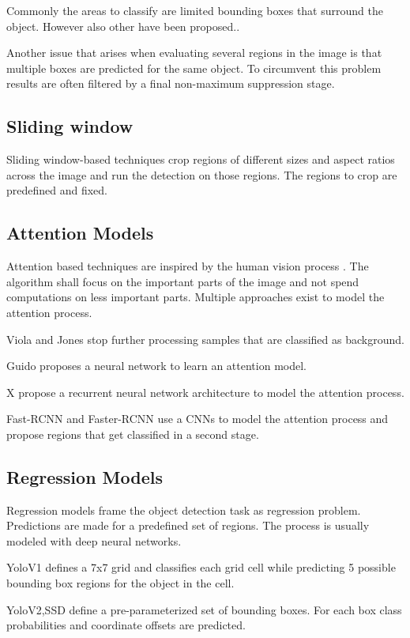 	Commonly the areas to classify are limited bounding boxes that surround the object. However also other have been proposed..	
	
	Another issue that arises when evaluating several regions in the image is that multiple boxes are predicted for the same object. To circumvent this problem results are often filtered by a final non-maximum suppression stage. 
	
	\subsection{Sliding window}
	
	Sliding window-based techniques crop regions of different sizes and aspect ratios across the image and run the detection on those regions. The regions to crop are predefined and fixed. 
	
	\subsection{Attention Models}
	
	Attention based techniques are inspired by the human vision process . The algorithm shall focus on the important parts of the image and not spend computations on less important parts. Multiple approaches exist to model the attention process.
	
	Viola and Jones stop further processing samples that are classified as background.
	
	Guido proposes a neural network to learn an attention model.
	
	X propose a recurrent neural network architecture to model the attention process.
	
	Fast-RCNN and Faster-RCNN use a \acp{CNN} to model the attention process and propose regions that get classified in a second stage.
	
	\subsection{Regression Models}
	
	Regression models frame the object detection task as regression problem. Predictions are made for a predefined set of regions. The process is usually modeled with deep neural networks.
	
	YoloV1 defines a 7x7 grid and classifies each grid cell while predicting 5 possible bounding box regions for the object in the cell.
	
	YoloV2,SSD define a pre-parameterized set of bounding boxes. For each box class probabilities and coordinate offsets are predicted. 
	
